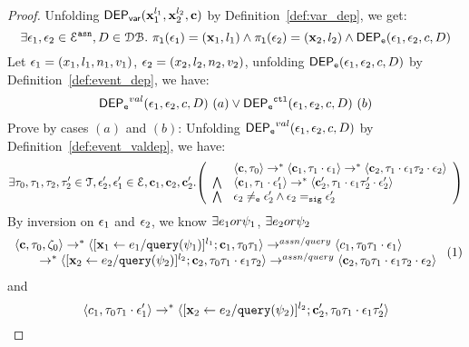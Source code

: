 \begin{proof}
Unfolding $\mathsf{DEP_{var}}({\boldsymbol{\mathbf{x}}}_1^{l_1}, {\boldsymbol{\mathbf{x}}}_2^{l_2}, {\boldsymbol{\mathbf{c}}})$ by Definition~\ref{def:var_dep},
we get:
\[
\exists \mathtt{\epsilon}_1, \mathtt{\epsilon}_2 \in \mathcal{E}^{\mathtt{{asn}}}, D \in \mathcal{DB}. ~
\mathtt{\pi_{l}(\mathtt{\epsilon}_1)} = ({\boldsymbol{\mathbf{x}}}_1, l_1)
\land
\mathtt{\pi_{l}(\mathtt{\epsilon}_2)} = ({\boldsymbol{\mathbf{x}}}_2, l_2)
\land 
\mathsf{DEP_{\mathtt{e}}}(\mathtt{\epsilon}_1, \mathtt{\epsilon}_2, c, D)
\]
%
Let $\mathtt{\epsilon}_1 = (x_1, l_1, n_1, v_1)$, $\mathtt{\epsilon}_2 = (x_2, l_2, n_2, v_2)$, unfolding $\mathsf{DEP_{\mathtt{e}}}(\mathtt{\epsilon}_1, \mathtt{\epsilon}_2, c, D)$ by Definition~\ref{def:event_dep}, we have:
\[
\mathsf{DEP_{\mathtt{e}}}^{val}(\mathtt{\epsilon}_1, \mathtt{\epsilon}_2, c, D) ~ (a) 
\lor
\mathsf{DEP_{\mathtt{e}}}^{\mathtt{{ctl}}}(\mathtt{\epsilon}_1, \mathtt{\epsilon}_2, c, D) ~ (b)
\]
Prove by cases $(a)$ and $(b)$:
Unfolding $\mathsf{DEP_{\mathtt{e}}}^{val}(\mathtt{\epsilon}_1, \mathtt{\epsilon}_2, c, D)$ by Definition~\ref{def:event_valdep}, we have:
\[
\exists \vtrace_0,
\vtrace_1, \vtrace_2, \vtrace_2' \in \mathcal{T}, \event_2', \event_1' \in \eventset, \ssa{c}_1, \ssa{c}_2,  \ssa{c}_2'.
  \left(
  \begin{array}{ll}   
 & \config{\ssa{c}, \vtrace_0} \rightarrow^{*} 
\config{\ssa{c}_1, \vtrace_1 \cdot \event_1}  \rightarrow^{*} 
  \config{\ssa{c}_2,  \vtrace_1 \cdot \event_1 \vtrace_2 \cdot \event_2 } 
 \\ 
 \bigwedge &
  \config{\ssa{c}_1, \vtrace_1 \cdot \event_1'}  \rightarrow^{*} 
  \config{\ssa{c}_2',  \vtrace_1 \cdot \event_1 \vtrace_2' \cdot \event_2' } 
\\
\bigwedge &
\event_2 \eventneq \event_2' \land \event_2 \sigeq \event_2'
\end{array}
\right)
 \]
 By inversion  on 
 $\mathtt{\epsilon}_1$ and $\mathtt{\epsilon}_2$, we know $\exists e_1 or \psi_1$, $\exists e_2 or \psi_2$
 \[
  \begin{array}{l}   
\langle {\boldsymbol{\mathbf{c}}}, \mathtt{\tau}_0, \mathtt{\zeta}_0 \rangle \rightarrow^{*} 
\langle [\mathrel{ {\boldsymbol{\mathbf{x}}}_1 \leftarrow e_1 / {\tt query}(\psi_1) }]^{l_1} ; {\boldsymbol{\mathbf{c}}}_1, \mathtt{\tau}_0 \mathtt{\tau}_1 \rangle  
\rightarrow^{assn/query}
 \langle c_1, \mathtt{\tau}_0 \mathtt{\tau}_1 \cdot \mathtt{\epsilon}_1 \rangle \\
  \qquad \rightarrow^{*} 
  \langle [\mathrel{ {\boldsymbol{\mathbf{x}}}_2 \leftarrow e_2 / {\tt query}(\psi_2) }]^{l_2};{\boldsymbol{\mathbf{c}}}_2, 
  \mathtt{\tau}_0 \mathtt{\tau}_1 \cdot \mathtt{\epsilon}_1 \mathtt{\tau}_2 \rangle 
  \rightarrow^{assn/query} 
  \langle {\boldsymbol{\mathbf{c}}}_2,  \mathtt{\tau}_0 \mathtt{\tau}_1 \cdot \mathtt{\epsilon}_1 \mathtt{\tau}_2 \cdot \mathtt{\epsilon}_2 \rangle 
\end{array} ~ (1)
 \]
 and 
  \[
  \langle c_1, \mathtt{\tau}_0 \mathtt{\tau}_1 \cdot \mathtt{\epsilon}_1' \rangle 
  \rightarrow^{*} 
  \langle [\mathrel{ {\boldsymbol{\mathbf{x}}}_2 \leftarrow e_2 / {\tt query}(\psi_2) }]^{l_2} ; {\boldsymbol{\mathbf{c}}}_2', \mathtt{\tau}_0 \mathtt{\tau}_1 \cdot \mathtt{\epsilon}_1 \mathtt{\tau}_2' \rangle 
\]
\end{proof}

